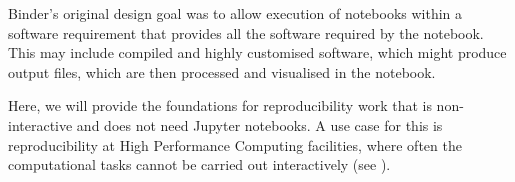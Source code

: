 \begin{task}
\begin{compactitem}
  Binder's original design goal was to allow execution of notebooks within a
  software requirement that provides all the software required by the notebook.
  This may include compiled and highly customised software, which might produce
  output files, which are then processed and visualised in the notebook.

  Here, we will provide the foundations for reproducibility work that is
  non-interactive and does not need Jupyter notebooks. A use case for this is
  reproducibility at High Performance Computing facilities, where often the
  computational tasks cannot be carried out interactively (see
  ).


  \end{compactitem}
\end{task}


%
%
%

